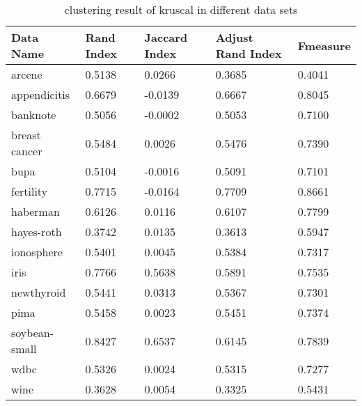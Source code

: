     	\begin{table}[htb]
	      \centering
	      \caption{clustering result of kruscal in different data sets}
	      \label{my-label}
	      \begin{tabular}{|lllll|}
	        \hline
	         Data Name & Rand Index  & Jaccard Index  & Adjust Rand Index & F\-measure  \\ \hline
	         arcene         & 0.5138 & 0.0266 & 0.3685 & 0.4041  \\ 
	         appendicitis   & 0.6679 & -0.0139 & 0.6667 & 0.8045 \\ 
	         banknote       & 0.5056 & -0.0002 & 0.5053 & 0.7100 \\ 
	         breast cancer  & 0.5484 & 0.0026 & 0.5476 & 0.7390\\ 
	         bupa           & 0.5104 & -0.0016 & 0.5091 & 0.7101  \\ 
	         fertility      & 0.7715 & -0.0164 & 0.7709 & 0.8661 \\ 
	         haberman       & 0.6126 & 0.0116 & 0.6107  & 0.7799  \\ 
	         hayes-roth     & 0.3742 & 0.0135 & 0.3613  & 0.5947 \\ 
	         ionosphere     & 0.5401 & 0.0045 & 0.5384  & 0.7317  \\ 
	         iris           & 0.7766 & 0.5638 & 0.5891  & 0.7535 \\ 
	         newthyroid     & 0.5441 & 0.0313 & 0.5367  & 0.7301  \\ 
	         pima           & 0.5458 & 0.0023 & 0.5451  & 0.7374 \\ 
	         soybean-small  & 0.8427 & 0.6537 & 0.6145  & 0.7839 \\ 
	         wdbc           & 0.5326 & 0.0024 & 0.5315  & 0.7277 \\ 
	         wine           & 0.3628 & 0.0054 & 0.3325  & 0.5431  \\ 
	         \hline
	      \end{tabular}
	    \end{table} 
		
